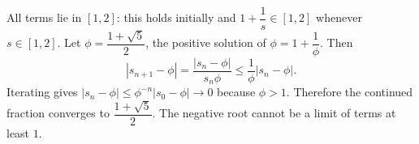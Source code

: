 All terms lie in $[1,2]$: this holds initially and $1+\dfrac{1}{s}\in[1,2]$ whenever $s\in[1,2]$. Let $\phi=\dfrac{1+\sqrt5}{2}$, the positive solution of $\phi=1+\dfrac{1}{\phi}$. Then
\[|s_{n+1}-\phi|=\dfrac{|s_n-\phi|}{s_n\phi}\le\dfrac{1}{\phi}|s_n-\phi|.\]
Iterating gives $|s_n-\phi|\le\phi^{-n}|s_0-\phi|\to0$ because $\phi>1$. Therefore the continued fraction converges to $\boxed{\dfrac{1+\sqrt5}{2}}$. The negative root cannot be a limit of terms at least $1$.
